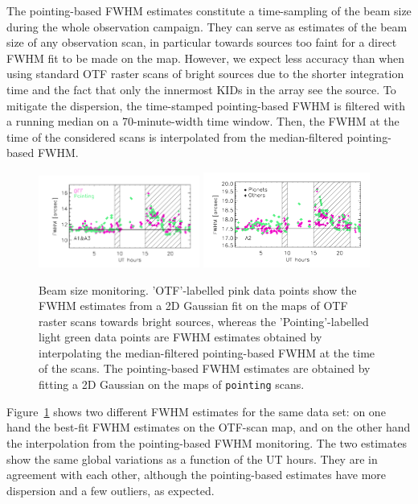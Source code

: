 \documentclass[traditionalabstract]{aa}
\newcommand{\lp}[1]{#1}
\begin{document}
{\begin{appendix}
The pointing-based FWHM estimates constitute a time-sampling of the
beam size during the whole observation campaign. They can serve as
estimates of the beam size of any observation scan, in particular
towards sources too faint for a direct FWHM %
fit to be made on the map. However, we
expect less accuracy than when using standard OTF raster
scans of bright sources due to the shorter integration time and the
fact that only the innermost KIDs in the array see the source.
To mitigate the dispersion, the time-stamped
pointing-based FWHM
is filtered with a running median on a 70-minute-width time window. Then, the FWHM %
at the time of the considered scans is
interpolated from the median-filtered pointing-based FWHM.%
%
\begin{figure}[ht!]
  \begin{center}
    \includegraphics[clip=true, trim={0.9cm, 0.5cm, 0.5cm, 0.5cm}, width=0.4725\textwidth]{Figures/Beam_monitoring_with_otfs_vs_ut_compare_pointings_1mm.pdf}
    \includegraphics[clip=true, trim={0.5cm, 0.5cm, 0.5cm, 0.5cm}, width=0.4875\textwidth]{Figures/Beam_monitoring_with_otfs_vs_ut_compare_pointings_a2.pdf}
    \caption[Beam size monitoring comparison]{Beam size monitoring.
     'OTF'-labelled pink data points show the FWHM estimates from a 2D
    Gaussian fit on the maps of OTF raster scans towards bright
    sources, whereas the 'Pointing'-labelled light green data points
    are FWHM estimates obtained by interpolating the {\lp
    median-filtered} pointing-based FWHM at the time of the
    scans. {\lp The
    pointing-based FWHM estimates are obtained by fitting a 2D Gaussian on the
    maps of {\tt pointing} scans.}}
\label{fig:beam_monitoring_compare}
\end{center}
\end{figure}
%
Figure~\ref{fig:beam_monitoring_compare} shows two different FWHM %
estimates for the same data set: on one hand the best-fit FWHM %
estimates on the OTF-scan map, and on the other hand the interpolation from
the pointing-based FWHM %
monitoring. The two estimates show the same global variations as a
function of the UT hours. They are in agreement with each
other, although the pointing-based estimates have more dispersion and
a few outliers, as expected.



\end{appendix}}
\end{document}
